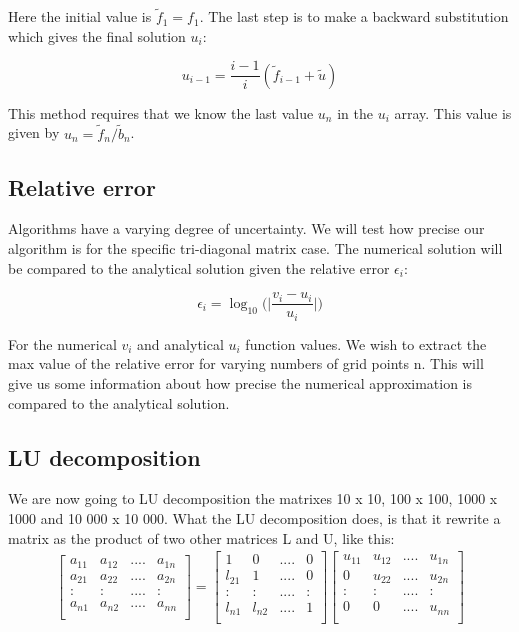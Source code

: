\documentclass[norsk,a4paper,12pt]{article}
\begin{document}
Here the initial value is $\tilde{f}_1=f_1$. The last step is to make a backward substitution which gives the final solution $u_i$:

\begin{equation}
u_{i-1}=\frac{i-1}{i}(\tilde{f}_{i-1}+\tilde{u})
 \label{eq:u_i-1}
 \end{equation}
 
 This method requires that we know the last value $u_n$ in the $u_i$ array. This value is given by $u_n=\tilde{f}_n/\tilde{b}_n$. 
 
 \subsection{Relative error}
 
 Algorithms have a varying degree of uncertainty. We will test how precise our algorithm is for the specific tri-diagonal matrix case. The numerical solution will be compared to the analytical solution given the relative error $\epsilon_i$:
 
 \begin{equation}
\epsilon_i = \log_{10}\bigg(\bigg|\frac{v_i-u_i}{u_i}\bigg|\bigg)
 \label{eq:eps}
 \end{equation}
 
For the numerical $v_i$ and analytical $u_i$ function values. We wish to extract the max value of the relative error for varying numbers of grid points n. This will give us some information about how precise the numerical approximation is compared to the analytical solution.

 \subsection{LU decomposition}

We are now going to LU decomposition the matrixes 10 x 10, 100 x 100, 1000 x 1000 and 10 000 x 10 000. What the LU decomposition does, is that it rewrite a matrix as the product of two other matrices L and U, like this:
\begin{align*}
\begin{bmatrix}
a_{11} & a_{12} & .... & a_{1n} \\
a_{21} & a_{22} & .... & a_{2n} \\
: & :& .... & : \\
a_{n1} & a_{n2} & .... & a_{nn} \\
\end{bmatrix}
=
\begin{bmatrix}
1 & 0 & .... & 0 \\
l_{21} & 1 & .... & 0 \\
: & :& .... & : \\
l_{n1} & l_{n2} & .... & 1\\
\end{bmatrix}
\begin{bmatrix}
u_{11} & u_{12} & .... & u_{1n} \\
0 & u_{22} & .... & u_{2n} \\
: & :& .... & : \\
0 & 0& .... & u_{nn} \\
\end{bmatrix}
\end{align*}
\end{document}
